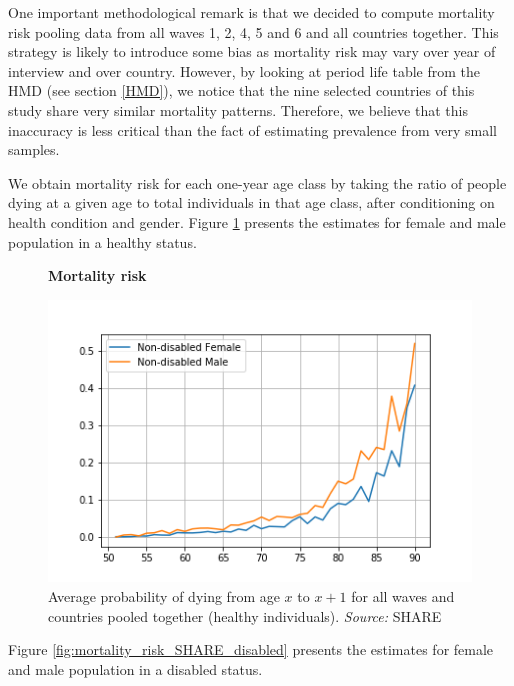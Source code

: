 






One important methodological remark is that we decided to compute mortality risk pooling data from all waves 1, 2, 4, 5 and 6 and all countries together. This strategy is likely to introduce some bias as mortality risk may vary over year of interview and over country. However, by looking at period life table from the HMD (see  section \ref{HMD}), we notice that the nine selected countries of this study share very similar mortality patterns. Therefore, we believe that this inaccuracy is less critical than the fact of estimating prevalence from very small samples. 


We obtain mortality risk for each one-year age class by taking the ratio of people dying at a given age to total individuals in that age class, after conditioning on health condition and gender. Figure \ref{fig:mortality_risk_SHARE_not_disabled} presents the estimates for female and male population in a healthy status. 

\begin{figure}[H]
    \centering \textbf{Mortality risk}\par\medskip
        \centering
        \includegraphics[scale=.5]{images/mortality_regime_SHARE_not_disabled.png}
    \caption{Average probability of dying from age $x$ to $x+1$ for all waves and countries pooled together (healthy individuals). \textit{Source:} SHARE  }
    \label{fig:mortality_risk_SHARE_not_disabled}
\end{figure}

Figure \ref{fig:mortality_risk_SHARE_disabled} presents the estimates for female and male population in a disabled status. 

